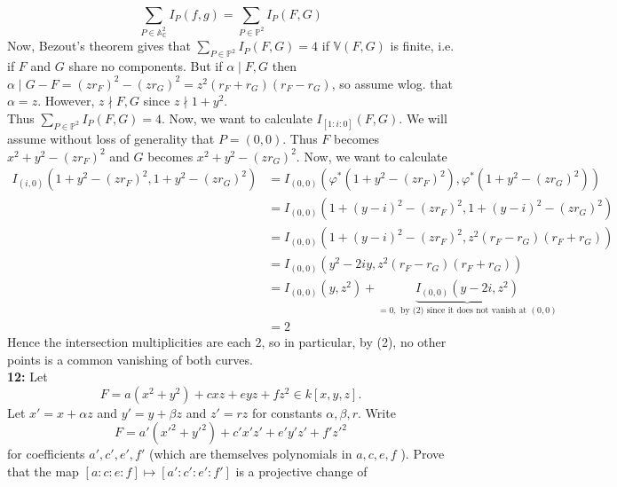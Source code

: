 \documentclass[a4paper]{article}
\begin{document}
      \[
      \sum_{P \in \mathbb{A}_{\mathbb{C}}^2} I_P(f, g)  
      = \sum_{P \in \mathbb{P}^2} I_P\left( F,G \right) 
      \] 
      Now, Bezout's theorem gives that
      $\sum_{P \in \mathbb{P}^2}I_P\left( F,G \right) 
      = 4$ if $\mathbb{V}(F,G)$ is finite, i.e. if $F$ and $G$ share no
      components. But if
      $\alpha  \mid F,G$ then
      $\alpha  \mid G-F
      = \left( zr_F \right)^2 - \left( zr_G \right)^2
      = z^2 \left( r_F + r_G \right) (r_F - r_G)$, so
      assume wlog. that $\alpha = z$. However,
      $z \nmid F,G$ since
      $z \nmid 1 + y^2$.\\
      Thus $\sum_{P \in \mathbb{P}^2}I_P(F,G) = 4$. Now,
      we want to calculate $I_{\left[ 1 : i : 0 \right] }(F,G)$. We will
      assume without loss of generality that $P = (0,0)$. Thus
       $F$ becomes $x^2 + y^2 - (zr_F)^2$ and
       $G$ becomes $x^2 + y^2 - (zr_G)^2$. Now, we want to calculate
       \begin{align*}
    I_{(i,0)} (1 + y^2 - (zr_F)^2, 1+ y^2 - (zr_G)^2)
    &= I_{(0,0)} \left( \varphi^{*}\left( 1 + y^2 - (zr_F)^2 \right) ,
    \varphi^{*} \left( 1 + y^2 - (zr_G)^2 \right) \right) \\
    &= I_{(0,0)}\left( 1 + (y-i)^2 - (zr_F)^2, 1+ (y-i)^2 - (zr_G)^2 \right) \\
       &= I_{(0,0)}(1+(y-i)^2 - (zr_F)^2, z^2 (r_F - r_G)(r_F + r_G))\\
       &= I_{(0,0)}\left( y^2 -2iy, z^2 (r_F - r_G)(r_F + r_G) \right) \\
       &= I_{(0,0)}\left( y, z^2 \right) + \underbrace{I_{(0,0)}\left( y-2i,
       z^2 \right)}_{=0, \text{ by (2) since it does not vanish at }(0,0)}\\
       &= 2
       \end{align*}
       Hence the intersection multiplicities are each $2$, so
       in particular, by (2), no other points is a common vanishing of both
       curves.\\
       \linebreak
       \textbf{12:} Let
       \[
       F = a \left( x^2 + y^2 \right) + cxz + eyz + fz^2
       \in k\left[ x,y,z \right] .
       \] 
       Let $x' = x + \alpha z$ and
       $y' = y + \beta z$ and
       $z' = rz$ for constants $\alpha, \beta, r$. Write
       \[
       F = a' \left( x'^2 + y'^2 \right) +c'x'z' + e'y'z' + f' z'^2
       \] 
       for coefficients $a',c',e',f'$ (which are themselves polynomials in
       $a,c,e,f$ ). Prove that the map
       $\left[ a : c : e :f \right] \mapsto 
       \left[ a' : c' : e' : f' \right] $ is a projective change of
\end{document}
